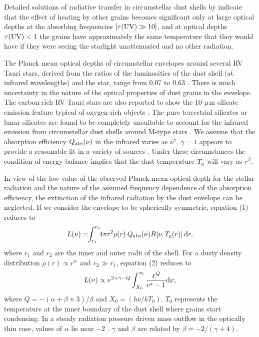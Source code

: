 \documentclass[useAMS,usenatbib]{mn2e}
\begin{document}
Detailed solutions of radiative transfer in circumstellar  dust
shells by \citet{b21,b22} indicate that the effect of heating by
other grains becomes significant only at large optical depths at
the absorbing frequencies $[\tau({\mathrm{UV}})\gg 10]$, and at optical
depths $\tau({\mathrm{UV}})<1$ the grains have approximately the same
temperature that they would have if they were seeing the starlight
unattenuated and no other radiation.

The Planck mean optical depths of circumstellar envelopes  around
several RV Tauri stars, derived from the ratios of the
luminosities of the dust shell (at infrared wavelengths) and the
star, range from 0.07 to 0.63 \citep{b9}. There is much
uncertainty in the nature of the optical properties of dust grains
in the envelope. The carbon-rich RV Tauri stars are also reported
to show the 10-$\mu$m silicate emission feature typical of
oxygen-rich objects \citep{b6,b19}. The pure terrestrial silicates
or lunar silicates are found to be completely unsuitable to
account for the infrared emission from circumstellar dust shells
around M-type stars \citep{b21}. We assume that the absorption
efficiency $Q_{{\mathrm{abs}}} (\nu)$ in the infrared varies as
$\nu^{\gamma}$. ${\gamma}=1$ appears to provide a reasonable fit
in a variety of sources \citep*{b11,b12}. Under these
circumstances the condition of energy balance implies that the
dust temperature $T_{{\mathrm{g}}}$ will vary as $r^{\beta}$.

In view of the low value of the observed Planck mean  optical depth for
the stellar radiation and the nature of the assumed frequency
dependence of the absorption efficiency, the extinction of the infrared
radiation by the dust envelope can be neglected. If we consider the
envelope to be spherically symmetric, equation (1) reduces to
\begin{equation}
   L(\nu)=\!\!\int_{r_{1}}^{r_{2}}\!\!4\pi r^2\rho(r)\> Q_{{\mathrm{abs}}}(\nu)B[\nu,T_{{\mathrm{g}}}(r)]\> {{\mathrm{d}}}r,
\end{equation}
where $r_1$ and $r_2$ are the inner and outer radii of the shell. For
a dusty density distribution $\rho(r)\propto r^{\alpha}$ and $r_2\gg
r_1$, equation (2) reduces to
\begin{equation}
   L(\nu)\propto \nu^{2+\gamma-Q}\int_{X_0}^{\infty}{{x^Q}\over
   {{\mathrm{e}}^x-1}}{\mathrm{d}}x ,
\end{equation}
where $Q=-(\alpha+\beta+3)/\beta$ and $X_0=(h\nu /kT_0)$. $T_0$
represents the temperature at the inner boundary of the dust shell
where grains start condensing. In a steady radiation pressure
driven mass outflow in the optically thin case, values of $\alpha$
lie near $-2$ \citep{b8}. $\gamma$ and $\beta$ are related by
$\beta=-2/(\gamma+4)$.
\end{document}
